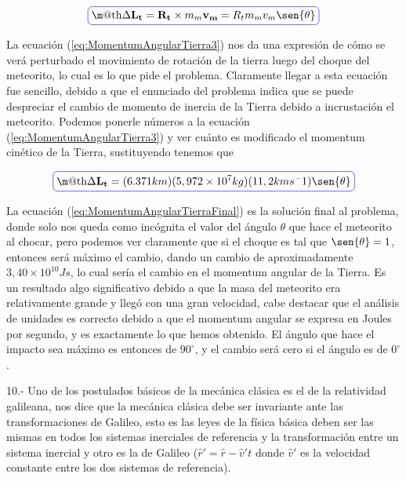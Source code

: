 \documentclass[a4paper,10pt]{article}
\makeatletter
\newcommand*{\boxcolor}{blue}
\renewcommand{\boxed}[1]{\textcolor{\boxcolor}{%
\tikz[baseline={([yshift=-1ex]current bounding box.center)}] \node [rectangle, minimum width=1ex,rounded corners,draw] {\normalcolor\m@th$\displaystyle#1$};}}
\makeatother
\begin{document}
\begin{equation}
 \boxed{\Delta \mathbf{L_t} = \mathbf{R_t} \times m_m \mathbf{v_m} = R_t m_m v_m \sen{\theta}}
 \label{eq:MomentumAngularTierra3}
\end{equation}

La ecuación (\ref{eq:MomentumAngularTierra3}) nos da una expresión de cómo se verá
perturbado el movimiento de rotación de la tierra luego del choque del meteorito, lo cual
es lo que pide el problema. Claramente llegar a esta ecuación fue sencillo, debido a que
el enunciado del problema indica que se puede despreciar el cambio de momento de inercia
de la Tierra debido a incrustación el meteorito. Podemos ponerle números a la ecuación
(\ref{eq:MomentumAngularTierra3}) y ver cuánto es modificado el momentum cinético de la 
Tierra, sustituyendo tenemos que

\begin{equation}
 \boxed{\Delta \mathbf{L_t} = (6.371 km) (5,972 \times 10^7 kg) (11,2 km s^-1) \sen{\theta}}
 \label{eq:MomentumAngularTierraFinal}
\end{equation}

La ecuación (\ref{eq:MomentumAngularTierraFinal}) es la solución final al problema,
donde solo nos queda como incógnita el valor del ángulo $\theta$ que hace el meteorito
al chocar, pero podemos ver claramente que si el choque es tal que $\sen{\theta} = 1$, entonces
será máximo el cambio, dando un cambio de aproximadamente $3,40 \times 10^10 Js$, lo cual
sería el cambio en el momentum angular de la Tierra. Es un resultado algo significativo
debido a que la masa del meteorito era relativamente grande y llegó con una gran velocidad,
cabe destacar que el análisis de unidades es correcto debido a que el momentum angular
se expresa en Joules por segundo, y es exactamente lo que hemos obtenido. El ángulo
que hace el impacto sea máximo es entonces de $90^\circ$, y el cambio será cero si 
el ángulo es de $0^\circ$.


\vspace{.3cm}

10.- Uno de los postulados básicos de la mecánica clásica es el de la relatividad galileana,
nos dice que la mecánica clásica debe ser invariante ante las transformaciones de Galileo, 
esto es las leyes de la física básica deben ser las mismas en todos los sistemas inerciales
de referencia y la transformación entre un sistema inercial y otro es la de Galileo 
($\hat{r}' = \hat{r} - \hat{v}'t$ donde $\hat{v}'$ es la velocidad constante entre los dos 
sistemas de referencia).
\end{document}
